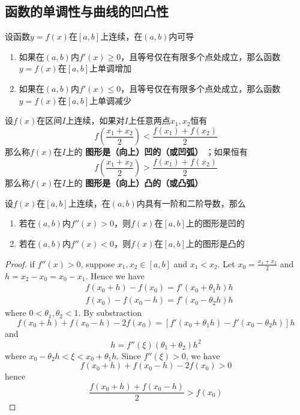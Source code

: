 \documentclass[11pt]{article}
\begin{document}
\subsection{函数的单调性与曲线的凹凸性}
\label{sec:orge588ba4}
\begin{theorem}[]
设函数\(y=f(x)\)在\([a,b]\)上连续，在\((a,b)\)内可导
\begin{enumerate}
\item 如果在\((a,b)\)内\(f'(x)\ge0\)，且等号仅在有限多个点处成立，那么函数
\(y=f(x)\)在\([a,b]\)上单调增加
\item 如果在\((a,b)\)内\(f'(x)\le0\)，且等号仅在有限多个点处成立，那么函数
\(y=f(x)\)在\([a,b]\)上单调减少
\end{enumerate}
\end{theorem}

\begin{definition}[]
设\(f(x)\)在区间\(I\)上连续，如果对\(I\)上任意两点\(x_1,x_2\)恒有
\begin{equation*}
f(\frac{x_1+x_2}{2})<\frac{f(x_1)+f(x_2)}{2}
\end{equation*}
那么称\(f(x)\)在\(I\)上的 \textbf{图形是（向上）凹的（或凹弧）} ；如果恒有
\begin{equation*}
f(\frac{x_1+x_2}{2})>\frac{f(x_1)+f(x_2)}{2}
\end{equation*}
那么称\(f(x)\)在\(I\)上的 \textbf{图形是（向上）凸的（或凸弧）}
\end{definition}

\begin{theorem}[]
设\(f(x)\)在\([a,b]\)上连续，在\((a,b)\)内具有一阶和二阶导数，那么
\begin{enumerate}
\item 若在\((a,b)\)内\(f''(x)>0\)，则\(f(x)\)在\([a,b]\)上的图形是凹的
\item 若在\((a,b)\)内\(f''(x)<0\)，则\(f(x)\)在\([a,b]\)上的图形是凸的
\end{enumerate}
\end{theorem}

\begin{proof}
if \(f''(x)>0\), suppose \(x_1,x_2\in[a,b]\) and \(x_1<x_2\). Let
\(x_0=\frac{x_1+x_2}{2}\) and \(h=x_2-x_0=x_0-x_1\). Hence we have
\begin{align*}
&f(x_0+h)-f(x_0)=f'(x_0+\theta_1 h)h\\
&f(x_0)-f(x_0-h)=f'(x_0-\theta_2h)h
\end{align*}
where \(0<\theta_1,\theta_2<1\). By substraction
\begin{equation*}
f(x_0+h)+f(x_0-h)-2f(x_0)=[f'(x_0+\theta_1h)-f'(x_0-\theta_2h)]h
\end{equation*}
and
\begin{equation*}
[f'(x_0+theta_1h)-f'(x_0-\theta_2h)]h=f''(\xi)(\theta_1+\theta_2)h^2
\end{equation*}
where \(x_0-\theta_2h<\xi<x_0+\theta_1h\). Since \(f''(\xi)>0\), we have
\begin{equation*}
f(x_0+h)+f(x_0-h)-2f(x_0)>0
\end{equation*}
hence
\begin{equation*}
\frac{f(x_0+h)+f(x_0-h)}{2}>f(x_0)
\end{equation*}
\end{proof}
\end{document}
